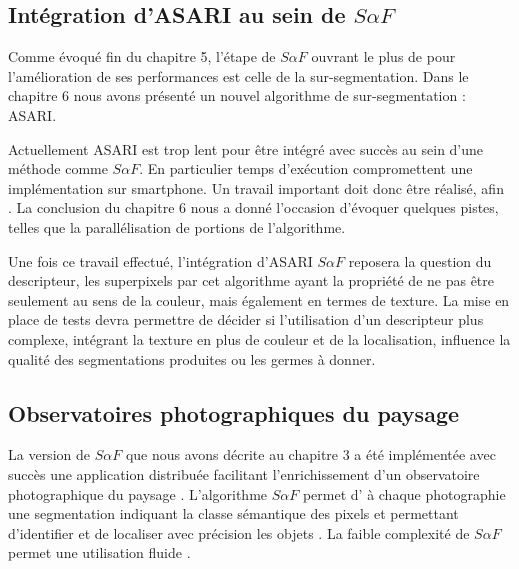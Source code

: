 \subsection{Intégration d'ASARI au sein de $S \alpha F$}

Comme évoqué  fin du chapitre 5, l'étape de $S \alpha F$ ouvrant le plus de  pour l'amélioration de ses performances est celle de la sur-segmentation. Dans le chapitre 6\modif{,} nous avons présenté un nouvel algorithme de sur-segmentation : ASARI. 

Actuellement\modif{,} ASARI est trop lent pour être intégré avec succès au sein d'une méthode comme $S \alpha F$. En particulier temps d'exécution compromettent une implémentation  sur smartphone. Un travail important doit donc être réalisé, afin . La conclusion du chapitre 6 nous a donné l'occasion d'évoquer quelques pistes, telles que la parallélisation de  portions de l'algorithme. 

Une fois ce travail effectué, l'intégration d'ASARI  $S \alpha F$ reposera la question du descripteur, les superpixels  par cet algorithme ayant la propriété de ne pas être seulement  au sens de la couleur, mais également en termes de texture. La mise en place de tests  devra permettre de décider si l'utilisation d'un descripteur plus complexe, intégrant la texture en plus de  couleur et de la localisation, influence la qualité des segmentations produites ou les germes à donner.

\subsection{Observatoires photographiques du paysage }
 
 La version de $S \alpha F$ que nous avons décrite au chapitre 3 a été implémentée avec succès  une application distribuée facilitant l'enrichissement d'un observatoire photographique du paysage \cite{puel2017une}. L'algorithme $S \alpha F$ permet d' à chaque photographie une segmentation indiquant la classe sémantique des pixels et permettant d'identifier et de localiser avec précision les objets . La faible complexité de $S \alpha F$ permet une utilisation fluide . 
 

